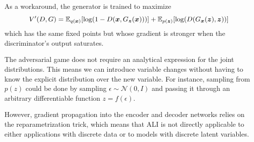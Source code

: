 \documentclass{article}
\begin{document}
As a workaround, the generator is trained to maximize
\begin{equation}
\label{eq:generator_value_function}
    V'(D, G) = \mathbb{E}_{q(\bm{x})}[\log(1 - D(\bm{x}, G_{\bm{z}}(\bm{x})))] +
               \mathbb{E}_{p(\bm{z})}[\log(D(G_{\bm{x}}(\bm{z}), \bm{z}))] \\
\end{equation}
which has the same fixed points but whose gradient is stronger when the
discriminator's output saturates.

The adversarial game does not require an analytical expression for the joint
distributions. This means we can introduce variable changes without having to
know the explicit distribution over the new variable.  For instance, sampling
from $p(z)$ could be done by sampling $\epsilon \sim \mathcal{N}(0, I)$ and
passing it through an arbitrary differentiable function $z = f(\epsilon)$.

However, gradient propagation into the encoder and decoder networks relies on
the reparametrization trick, which means that ALI is not directly
applicable to either applications with discrete data or to models with
discrete latent variables.
\end{document}
